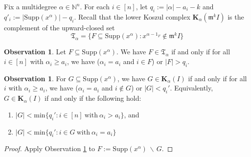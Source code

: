 \documentclass[10pt,reqno]{amsart}
\theoremstyle{definition}
\newtheorem{obs}[subsection]{Observation}
\theoremstyle{remark}
\numberwithin{equation}{section}
\newcommand{\m}{\mathfrak m}
\numberwithin{equation}{section}
\begin{document}
Fix a multidegree $\alpha\in \mathbb{N}^n$. For each $i\in [n]$, let $q_i:=|\alpha| -a_i-k$ and $q'_i:=|\mathrm{Supp}(x^{\alpha}) | - q_i$. Recall that the lower Koszul complex $\mathbf{K}_{\alpha}(\m^kI)$ is the complement of the upward-closed set \[
\mathfrak T_{\alpha}=\{F\subseteq \mathrm{Supp}(x^{\alpha}): x^{\alpha-1_F}\notin \m^kI \}
\]

\begin{obs}\label{obs1} Let $F\subseteq \mathrm{Supp}(x^{\alpha})$. We have $F\in \mathfrak T_{\alpha}$ if and only if for all $i\in [n]$ with $\alpha_i\ge a_i$, we have ($\alpha_i=a_i$ and $i\in F$) or $|F|>q_i$.

\end{obs} 

\begin{obs}\label{obs2}
For $G\subseteq \mathrm{Supp}(x^{\alpha})$, we have $G\in \mathbf K_{\alpha}(I)$ if and only if for all $i$ with $\alpha_i\ge a_i$, we have ($\alpha_i=a_i$ and $i\notin G$) or $|G|<q_i'$. Equivalently, $G\in \mathbf K_{\alpha}(I)$ if and only if the following hold:

\begin{enumerate}
\item $|G|<\mathrm{min}\{q_i': i\in [n]\ \mathrm{with}\ \alpha_i>a_i\}$, and 

\item $|G|<\mathrm{min}\{q_i': i\in G \ \mathrm{with}\ \alpha_i=a_i\}$

\end{enumerate}

\end{obs}
\begin{proof}
Apply Observation \ref{obs1} to $F:=\mathrm{Supp}(x^{\alpha})\, \backslash\, G$.
\end{proof}
\end{document}
